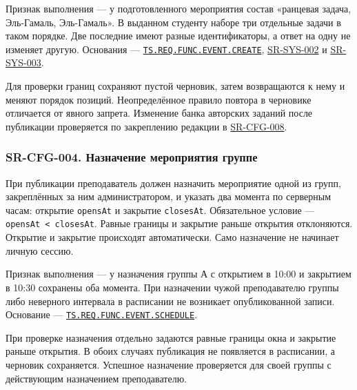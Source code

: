 \documentclass[12pt,a4paper]{article}
\begin{document}
Признак выполнения --- у подготовленного мероприятия состав «ранцевая задача, Эль-Гамаль, Эль-Гамаль». В выданном студенту наборе три отдельные задачи в таком порядке. Две последние имеют разные идентификаторы, а ответ на одну не изменяет другую. Основания --- {\href{../02\_Техническое\_задание/Техническое\_задание.pdf\#ts-req-func-event-create}{\texttt{TS.\allowbreak{}REQ.\allowbreak{}FUNC.\allowbreak{}EVENT.\allowbreak{}CREATE}}}, {\hyperlink{sr-sys-002}{SR-SYS-002}} и {\hyperlink{sr-sys-003}{SR-SYS-003}}.

Для проверки границ сохраняют пустой черновик, затем возвращаются к нему и меняют порядок позиций. Неопределённое правило повтора в черновике отличается от явного запрета. Изменение банка авторских заданий после публикации проверяется по закреплению редакции в {\hyperlink{sr-cfg-008}{SR-CFG-008}}.

\subsubsection{SR-CFG-004. Назначение мероприятия группе}\label{sr-cfg-004-ux43dux430ux437ux43dux430ux447ux435ux43dux438ux435-ux43cux435ux440ux43eux43fux440ux438ux44fux442ux438ux44f-ux433ux440ux443ux43fux43fux435}

\hypertarget{sr-cfg-004-назначение-мероприятия-группе}{}

\hypertarget{sr-cfg-004}{}

При публикации преподаватель должен назначить мероприятие одной из групп, закреплённых за ним администратором, и указать два момента по серверным часам: открытие \texttt{opensAt} и закрытие \texttt{closesAt}. Обязательное условие --- \texttt{opensAt\ \textless{}\ closesAt}. Равные границы и закрытие раньше открытия отклоняются. Открытие и закрытие происходят автоматически. Само назначение не начинает личную сессию.

Признак выполнения --- у назначения группы А с открытием в 10:00 и закрытием в 10:30 сохранены оба момента. При назначении чужой преподавателю группы либо неверного интервала в расписании не возникает опубликованной записи. Основание --- {\href{../02\_Техническое\_задание/Техническое\_задание.pdf\#ts-req-func-event-schedule}{\texttt{TS.\allowbreak{}REQ.\allowbreak{}FUNC.\allowbreak{}EVENT.\allowbreak{}SCHEDULE}}}.

При проверке назначения отдельно задаются равные границы окна и закрытие раньше открытия. В обоих случаях публикация не появляется в расписании, а черновик сохраняется. Успешное назначение проверяется для своей группы с действующим назначением преподавателю.
\end{document}
